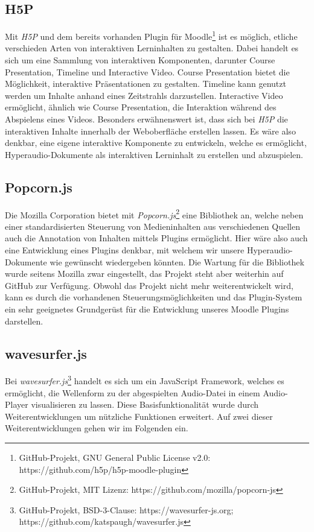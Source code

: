 \subsection{H5P}
Mit \textit{H5P} und dem bereits vorhanden Plugin für Moodle\footnote{GitHub-Projekt, GNU General Public License v2.0: https://github.com/h5p/h5p-moodle-plugin} ist es möglich, etliche verschieden Arten von interaktiven Lerninhalten zu gestalten. Dabei handelt es sich um eine Sammlung von interaktiven Komponenten, darunter Course Presentation, Timeline und Interactive Video. Course Presentation bietet die Möglichkeit, interaktive Präsentationen zu gestalten. Timeline kann genutzt werden um Inhalte anhand eines Zeitstrahls darzustellen. Interactive Video ermöglicht, ähnlich wie Course Presentation, die Interaktion während des Abspielens eines Videos. Besonders erwähnenswert ist, dass sich bei \textit{H5P} die interaktiven Inhalte innerhalb der Weboberfläche erstellen lassen. Es wäre also denkbar, eine eigene interaktive Komponente zu entwickeln, welche es ermöglicht, Hyperaudio-Dokumente als interaktiven Lerninhalt zu erstellen und abzuspielen.

\subsection{Popcorn.js}
Die Mozilla Corporation bietet mit \textit{Popcorn.js}\footnote{GitHub-Projekt, MIT Lizenz: https://github.com/mozilla/popcorn-js} eine Bibliothek an, welche neben einer standardisierten Steuerung von Medieninhalten aus verschiedenen Quellen auch die Annotation von Inhalten mittels Plugins ermöglicht. Hier wäre also auch eine Entwicklung eines Plugins denkbar, mit welchem wir unsere Hyperaudio-Dokumente wie gewünscht wiedergeben könnten. Die Wartung für die Bibliothek wurde seitens Mozilla zwar eingestellt, das Projekt steht aber weiterhin auf GitHub zur Verfügung. Obwohl das Projekt nicht mehr weiterentwickelt wird, kann es durch die vorhandenen Steuerungsmöglichkeiten und das Plugin-System ein sehr geeignetes Grundgerüst für die Entwicklung unseres Moodle Plugins darstellen.
 
\subsection{wavesurfer.js}
\label{sec:wavesurfer.js}
Bei \textit{wavesurfer.js}\footnote{GitHub-Projekt, BSD-3-Clause: https://wavesurfer-js.org; https://github.com/katspaugh/wavesurfer.js} handelt es sich um ein JavaScript Framework, welches es ermöglicht, die Wellenform zu der abgespielten Audio-Datei in einem Audio-Player visualisieren zu lassen. Diese Basisfunktionalität wurde durch Weiterentwicklungen um nützliche Funktionen erweitert. Auf zwei dieser Weiterentwicklungen gehen wir im Folgenden ein.

